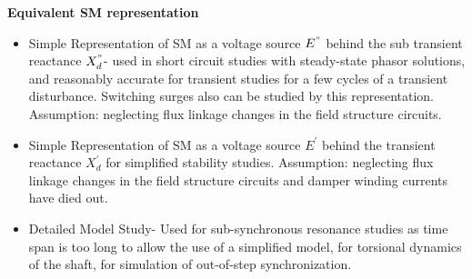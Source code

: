 \documentclass{report}
\begin{document}
\textbf{Equivalent SM representation}
\begin{itemize}
    \item Simple Representation of SM as a voltage source $E^"$ behind the sub transient reactance $X_d^{"}$- used in short circuit studies with steady-state phasor solutions, and reasonably accurate for transient studies for a few cycles of a transient disturbance. Switching surges also can be studied by this representation. Assumption: neglecting flux linkage changes in the field structure circuits.
    \item Simple Representation of SM as a voltage source $E^{'}$ behind the transient reactance $X_{d}^{'}$ for simplified stability studies. Assumption: neglecting flux linkage changes in the field structure circuits and damper winding currents have died out.
    \item Detailed Model Study- Used for sub-synchronous resonance studies as time span is too long to allow the use of a simplified model, for torsional dynamics of the shaft, for simulation of out-of-step synchronization.
\end{itemize}
\end{document}

